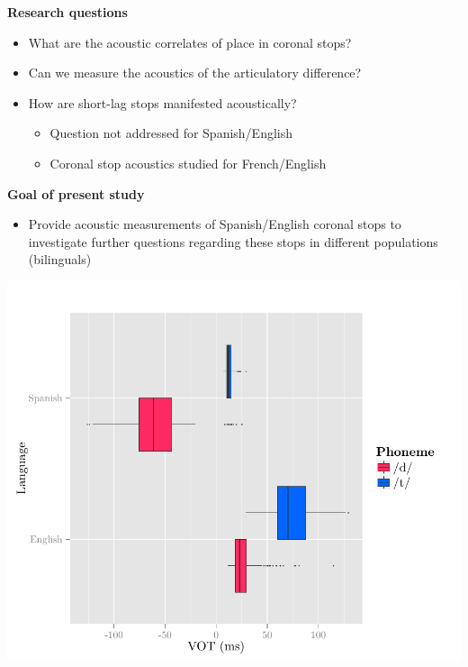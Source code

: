 \documentclass[a0paper,portrait,columns=2]{baposter}
\begin{document}
\begin{poster}
{\vspace{.1in}
\textbf{Research questions}
\vspace{.05in}

\begin{itemize}
	\item What are the acoustic correlates of place in coronal stops?
	\item Can we measure the acoustics of the articulatory difference?
	\item How are short-lag stops manifested acoustically?\\ \vspace{-.1in}
	\begin{itemize}
		\item Question not addressed for Spanish/English
		\item Coronal stop acoustics studied for French/English \cite{sundara2005acoustic}
	\end{itemize}
\end{itemize}



\begin{center}
	\begin{minipage}{.55\linewidth}
	\textbf{Goal of present study}
	\vspace{.05in}
	\begin{itemize}
		\item[] Provide acoustic measurements of Spanish/English coronal stops to investigate further questions regarding these stops in different populations (bilinguals)
	\end{itemize}
	\end{minipage}%
	\begin{minipage}{.45\linewidth}
	\centering
	\includegraphics[width=.75\textwidth]{figures/vot.pdf}
	\end{minipage}
\end{center}

}
\end{poster}
\end{document}
